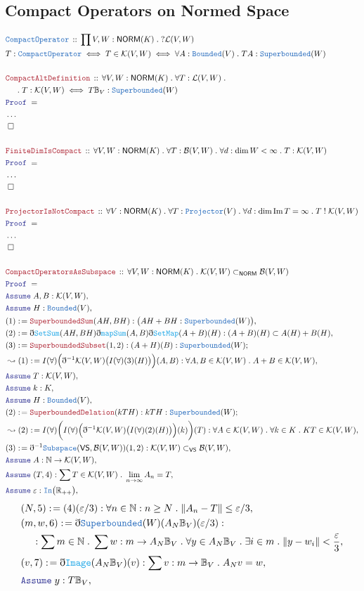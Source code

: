 \documentclass[12pt]{scrartcl}
\newcommand{\TYPE}[1]{\textcolor{NavyBlue}{\mathtt{#1}}}
\newcommand{\FUNC}[1]{\textcolor{Cerulean}{\mathtt{#1}}}
\newcommand{\LOGIC}[1]{\textcolor{Blue}{\mathtt{#1}}}
\newcommand{\THM}[1]{\textcolor{Maroon}{\mathtt{#1}}}
\renewcommand{\.}{\; . \;}
\newcommand{\de}{: \kern 0.1pc =}
\newcommand{\IsNot}{\; ! \;}
\newcommand{\Theorem}[2]{& \THM{#1} \, :: \, #2 \\ & \Proof = \\ }
\newcommand{\DeclareType}[2]{& \TYPE{#1} \, :: \, #2 \\}
\newcommand{\DefineNamedType}[4]{& #1 : \TYPE{#2} \iff #3 \iff #4 \\}
\newcommand{\NewLine}{\\ & \kern 1pc}
\newcommand{\Page}[1]{\begin{align*} #1 \end{align*} \newpage   }
\newcommand{ \bd }{ \ByDef }
\newcommand{\NoProof}{ & \ldots \\ \EndProof}
\newcommand{\Reals}{\mathbb{R} }
\newcommand{\Nat}{\mathbb{N} }
\DeclareMathOperator*{\im}{Im}
\newcommand{\Say}[3]{& #1 \de #2 : #3, \\}
\newcommand{\Conclude}[3]{& #1 \de #2 : #3; \\}
\newcommand{\Derive}[3]{& \leadsto #1 \de #2 : #3, \\}
\newcommand{\A}{\LOGIC{Assume} \;}
\newcommand{\Assume}[2]{& \A #1 : #2, \\}
\newcommand{\QED}{\; \square}
\newcommand{\EndProof}{& \QED \\}
\newcommand{\ByDef}{\eth}
\newcommand{\Proof}{\LOGIC{Proof} \; }
\newcommand{\SB}{\TYPE{Superbounded}}
\newcommand{\NORM}{\mathsf{NORM}} %
\newcommand{\K}{\mathcal{K}} %
\newcommand{\B}{\mathcal{B}}
\begin{document}
\subsection{ Compact Operators on Normed Space}
\Page{
 \DeclareType{CompactOperator}{\prod V,W : \NORM(K) \. ?\mathcal{L}(V,W)}
 \DefineNamedType{T}{CompactOperator}{ T \in \K(V,W)}{ \forall A : \TYPE{Bounded}(V) \. TA : \SB(W) }
 \\
 \Theorem{CompactAltDefinition}{ \forall V,W : \NORM(K) \. \forall T : \mathcal{L}(V,W) \. 
 \NewLine \. T : \K(V,W) \iff T \mathbb{B}_V : \SB(W)}
 \NoProof
 \\
 \Theorem{FiniteDimIsCompact}{\forall V,W : \NORM(K) \. \forall T : \B(V,W) \. \forall d : \dim W < \infty \. T : \K(V,W) }
 \NoProof
 \\
 \Theorem{ProjectorIsNotCompact}{\forall V : \NORM(K) \. \forall T : \TYPE{Projector}(V) \. \forall d : \dim \im T = \infty \. 
 T \IsNot \K(V,W)}
 \NoProof
 \\
 \Theorem{CompactOperatorsAsSubspace}{\forall V,W : \NORM(K) \. \K(V,W) \subset_\NORM \B(V,W)} 
 \Assume{A,B}{\K(V,W)}
 \Assume{H}{\TYPE{Bounded}(V)}
 \Say{(1)}{\THM{SuperboundedSum}(AH,BH)}{ \big(AH + BH : \SB(W) \big)}
 \Say{(2)}{\bd \FUNC{SetSum}(AH,BH) \bd \FUNC{mapSum}(A,B) \bd \FUNC{SetMap}(A + B)(H)}{ (A + B)(H) \subset A(H) + B(H)  }
 \Conclude{(3)}{ \THM{SuperboundedSubset}(1,2)}{ (A + H)(B) : \SB(W)}
 \Derive{(1)}{ I(\forall)\Big(\bd^{-1} \K(V,W)\big( I(\forall)(3)(H)\big) \Big)(A, B)  }{ \forall A,B \in \K(V,W) \. A + B \in \K(V,W)}
 \Assume{T}{\K(V,W)}
 \Assume{k}{K}
 \Assume{ H  }{\TYPE{Bounded}(V)}
 \Conclude{(2)}{ \THM{SuperboundedDelation}( kTH) }{  kTH : \SB(W)  }
 \Derive{(2)}{ I(\forall)\bigg( I(\forall)\Big( \bd^{-1} \K(V,W)\big( I(\forall)(2)(H) \big)  \Big)(k)  \bigg)(T)}{ \forall A \in \K(V,W) \. \forall k \in K \.  KT \in \K(V,W)  }
 \Say{(3)}{ \bd^{-1} \TYPE{Subspace}(\mathsf{VS},\B(V,W) )(1,2)  }{ \K(V,W) \subset_{\mathsf{VS}}  \B(V,W)  }
 \Assume{A}{\Nat \to \K(V,W)} 
 \Assume{(T,4)}{\sum T \in \K(V,W) \. \lim_{n \to \infty} A_n = T}
 \Assume{\varepsilon}{\TYPE{In}\big(\Reals_{++} \big)}
 } \Page{
 \Say{ (N,5)  }{ (4)( \varepsilon / 3)  }{ \forall n \in \Nat : n \ge N \. \| A_n - T \| \le \varepsilon/3   }
 \Say{ (m,w,6) }{  \bd \SB(W)(A_N \mathbb{B}_V)(\varepsilon / 3) }{ 
 \NewLine : \sum m \in \Nat \. \sum w : m \to A_N \mathbb{B}_V \. \forall y \in A_N \mathbb{B}_V \. \exists i \in m \. \| y - w_i \| < \frac{\varepsilon}{3} }
 \Say{  (v,7)  }{ \bd \FUNC{Image}(A_N \mathbb{B}_V)(v)}{ \sum v : m \to \mathbb{B}_V \. A_N v = w }
 \Assume{y}{ T \mathbb{B}_V }
}
\end{document}

